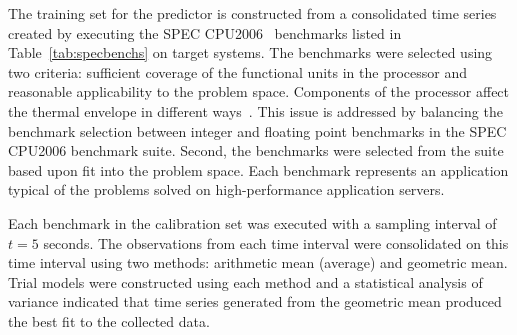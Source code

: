 \documentclass[prodmode,acmtaco,pdftex]{acmsmall}
\begin{document}
\begin{table}%
\end{table}
The training set for the predictor is constructed from a consolidated
time series created by executing the SPEC CPU2006~\cite{spec2006}
benchmarks listed in Table~\ref{tab:specbenchs} on target systems.  The
benchmarks were selected using two criteria: sufficient coverage of the
functional units in the processor and reasonable applicability to the
problem space.  Components of the processor affect the thermal envelope
in different ways~\cite{Kumar2008}.  This issue is addressed by
balancing the benchmark selection between integer and floating point
benchmarks in the SPEC CPU2006 benchmark suite.  Second, the benchmarks
were selected from the suite based upon fit into the problem space.
Each benchmark represents an application typical of the problems solved
on high-performance application servers.  

Each benchmark in the calibration set was executed with a sampling
interval of $t=5$ seconds.  The observations from each time interval
were consolidated on this time interval using two methods: arithmetic
mean (average) and geometric mean.  Trial models were constructed using
each method and a statistical analysis of variance indicated that time
series generated from the geometric mean
produced the best fit to the collected data.
   
\end{document}
